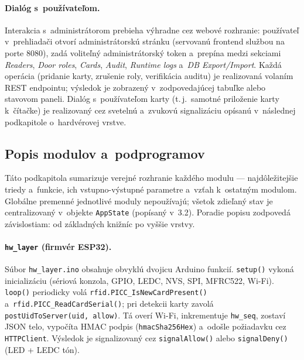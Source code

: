 \documentclass[a4paper]{feidipsp}
\begin{document}
\paragraph{Dialóg s~používateľom.}

Interakcia s~administrátorom prebieha výhradne cez webové rozhranie: používateľ v~prehliadači otvorí administrátorskú stránku (servovanú frontend službou na porte 8080), zadá voliteľný administrátorský token a~prepína medzi sekciami \emph{Readers}, \emph{Door roles}, \emph{Cards}, \emph{Audit}, \emph{Runtime logs} a~\emph{DB Export/Import}. Každá operácia (pridanie karty, zrušenie roly, verifikácia auditu) je realizovaná volaním REST endpointu; výsledok je zobrazený v~zodpovedajúcej tabuľke alebo stavovom paneli. Dialóg s~používateľom karty (t.\,j.~samotné priloženie karty k~čítačke) je realizovaný cez svetelnú a~zvukovú signalizáciu opísanú v~následnej podkapitole o~hardvérovej vrstve.

\subsection{Popis modulov a~podprogramov}

Táto podkapitola sumarizuje verejné rozhranie každého modulu --- najdôležitejšie triedy a~funkcie, ich vstupno-výstupné parametre a~vzťah k~ostatným modulom. Globálne premenné jednotlivé moduly nepoužívajú; všetok zdieľaný stav je centralizovaný v~objekte \texttt{AppState} (popísaný v~3.2). Poradie popisu zodpovedá závislostiam: od základných knižníc po vyššie vrstvy.

\paragraph{\texttt{hw\_layer} (firmvér ESP32).}
Súbor \texttt{hw\_layer.ino} obsahuje obvyklú dvojicu Arduino funkcií. \texttt{setup()} vykoná inicializáciu (sériová konzola, GPIO, LEDC, NVS, SPI, MFRC522, Wi-Fi). \texttt{loop()} periodicky volá \texttt{rfid.PICC\_IsNewCardPresent()} a~\texttt{rfid.PICC\_ReadCardSerial()}; pri detekcii karty zavolá \texttt{postUidToServer(uid, allow)}. Tá overí Wi-Fi, inkrementuje \texttt{hw\_seq}, zostaví JSON telo, vypočíta HMAC podpis (\texttt{hmacSha256Hex}) a~odošle požiadavku cez \texttt{HTTPClient}. Výsledok je signalizovaný cez \texttt{signalAllow()} alebo \texttt{signalDeny()} (LED + LEDC tón).
\end{document}
